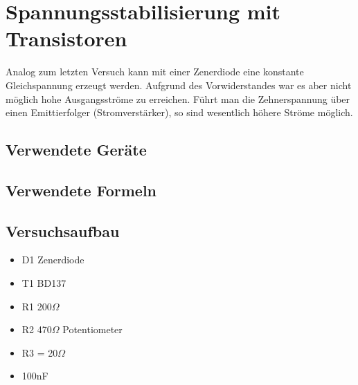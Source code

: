 \documentclass[12pt,a4paper]{article}
\begin{document}
\section{Spannungsstabilisierung mit Transistoren}
Analog zum letzten Versuch kann mit einer Zenerdiode eine konstante Gleichspannung erzeugt werden. Aufgrund des Vorwiderstandes war es aber nicht möglich hohe Ausgangsströme zu erreichen. Führt man die Zehnerspannung über einen Emittierfolger (Stromverstärker), so sind wesentlich höhere Ströme möglich.
\subsection{Verwendete Geräte}
\subsection{Verwendete Formeln}
\subsection{Versuchsaufbau}

\begin{itemize}
\item	D1 Zenerdiode

\item	T1 BD137

\item	R1 200$\Omega$

\item	R2 470$\Omega$ Potentiometer

\item	R3 = 20$\Omega$

\item	100nF
\end{itemize}
\end{document}
